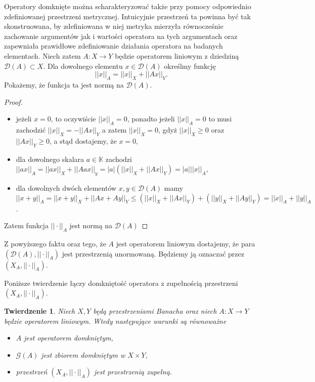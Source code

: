 \documentclass[12pt]{article}
\newtheorem{tw}{Twierdzenie}
\begin{document}
Operatory domknięte można scharakteryzować także przy pomocy odpowiednio zdefiniowanej przestrzeni metrycznej. Intuicyjnie przestrzeń ta powinna być tak skonstruowana, by zdefiniowana w niej metryka mierzyła równocześnie zachowanie argumentów jak i wartości operatora na tych argumentach oraz zapewniała prawidłowe zdefiniowanie działania operatora na badanych elementach. Niech zatem $A\colon X\to Y$ będzie operatorem liniowym z dziedziną $\mathcal{D}(A)\subset X$. Dla dowolnego elementu $x\in \mathcal{D}(A)$ określmy funkcję 
\begin{displaymath}
	||x||_A = ||x||_X + ||Ax||_Y.
\end{displaymath}
Pokażemy, że funkcja ta jest normą na $\mathcal{D}(A)$.
\begin{proof}
	\begin{itemize}
		\item jeżeli $x = 0$, to oczywiście $||x||_A = 0$, ponadto jeżeli $||x||_A = 0$ to musi zachodzić $||x||_X = -||Ax||_Y$ a zatem $||x||_X = 0$, gdyż $||x||_X \geq 0$ oraz $||Ax||_Y \geq 0$, a stąd dostajemy, że $x = 0$,
		\item dla dowolnego skalara $a\in \mathbb{K}$ zachodzi $||ax||_A = ||ax||_X + ||Aax||_y = |a|(||x||_X+ ||Ax||_Y) = |a|||x||_A$,
		\item dla dowolnych dwóch elementów $x,y\in \mathcal{D}(A)$ mamy $||x+y||_A = ||x+y||_X+ ||Ax+Ay||_Y\leq (||x||_X + ||Ax||_Y) + (||y||_X + ||Ay||_Y) = ||x||_A + ||y||_A$.
	\end{itemize}
	Zatem funkcja $||\cdot||_A$ jest normą na $\mathcal{D}(A)$
\end{proof}
Z powyższego faktu oraz tego, że $A$ jest operatorem liniowym dostajemy, że para $(\mathcal{D}(A), ||\cdot||_A)$ jest przestrzenią unormowaną. Będziemy ją oznaczać przez $(X_A, ||\cdot||_A)$.

Poniższe twierdzenie łączy domkniętość operatora z zupełnością przestrzeni $(X_A, ||\cdot||_A)$.
\begin{tw}
	Niech $X,Y$ będą przestrzeniami Banacha oraz niech $A\colon X\to Y$ będzie operatorem liniowym. Wtedy następujące warunki są równoważne
	\begin{itemize}
		\item $A$ jest operatorem domkniętym,
		\item $\mathcal{G}(A)$ jest zbiorem domkniętym w $X\times Y$,
		\item przestrzeń $(X_A, ||\cdot||_A)$ jest przestrzenią zupełną.
	\end{itemize}
\end{tw}
\end{document}
